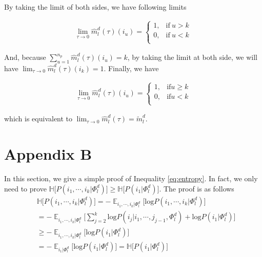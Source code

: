 \documentclass[11pt]{article}
\begin{document}
By taking the limit of both sides, we have following limits

\begin{align*}
\lim_{\tau \rightarrow 0} \hat{m}_l^d(\tau)(i_u) = \begin{cases}
      1, & \text{if}\ u > k \\
      0, & \text{if}\ u < k \\
    \end{cases}
\end{align*}

And, because $ \displaystyle{\mathop{\sum}_{u=1}^{n_p}}\hat{m}_l^d(\tau)(i_u) = k$, by taking the limit at both side, we will have $\lim_{\tau \rightarrow 0} \hat{m}_l^d(\tau)(i_k) = 1$. Finally, we have

\begin{align*}
\lim_{\tau \rightarrow 0} \hat{m}_l^d(\tau)(i_u) = \begin{cases}
      1, & \text{if} u \geqslant k \\
      0, & \text{if} u < k \\
    \end{cases}
\end{align*}

which is equivalent to $\lim_{\tau \rightarrow 0}\hat{m}_l^d(\tau) = \tilde{m}_l^d$.

\section{Appendix B}
\label{appendix:b}
In this section, we give a simple proof of Inequality \ref{eq:entropy}. In fact, we only need to prove $\mathbb{H} \big[ P(i_1,\cdots,i_k | \Phi_l^d) \big] \geqslant \mathbb{H} \big[ P(i_1 | \Phi_l^d) \big]$. The proof is as follows
\begin{align*}
&\mathbb{H} \big[ P(i_1,\cdots,i_k | \Phi_l^d) \big] = - \displaystyle{\mathop{\mathbb{E}}_{i_1,\cdots,i_k | \Phi_l^d}} \big[ \text{log}P(i_1,\cdots,i_k | \Phi_l^d) \big] \\
&= -\displaystyle{\mathop{\mathbb{E}}_{i_1,\cdots,i_k | \Phi_l^d}} \big[ \displaystyle{\sum_{j=2}^k}\text{log}P(i_j | i_1,\cdots,j_{j-1},\Phi_l^d) +  \text{log} P(i_1 | \Phi_l^d) \big] \\
&\geqslant -\displaystyle{\mathop{\mathbb{E}}_{i_1,\cdots,i_k | \Phi_l^d}} \big[ \text{log} P(i_1 | \Phi_l^d) \big] \\
&= -\displaystyle{\mathop{\mathbb{E}}_{i_1 | \Phi_l^d}} \big[ \text{log} P(i_1 | \Phi_l^d) \big] = \mathbb{H} \big[ P(i_1 | \Phi_l^d) \big]
\end{align*}
\end{document}
